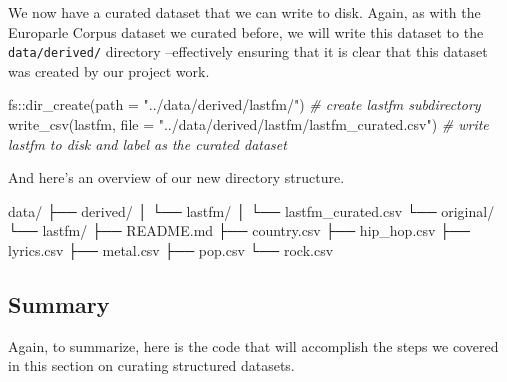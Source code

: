 \documentclass[
  letterpaper,
]{scrbook}
\newenvironment{Shaded}{\begin{snugshade}}{\end{snugshade}}
\newcommand{\AttributeTok}[1]{\textcolor[rgb]{0.00,0.00,0.00}{#1}}
\newcommand{\CommentTok}[1]{\textcolor[rgb]{0.00,0.00,0.00}{\textit{#1}}}
\newcommand{\ExtensionTok}[1]{\textcolor[rgb]{0.00,0.00,0.00}{#1}}
\newcommand{\FunctionTok}[1]{\textcolor[rgb]{0.00,0.00,0.00}{#1}}
\newcommand{\NormalTok}[1]{\textcolor[rgb]{0.00,0.00,0.00}{#1}}
\newcommand{\SpecialCharTok}[1]{\textcolor[rgb]{0.00,0.00,0.00}{#1}}
\newcommand{\StringTok}[1]{\textcolor[rgb]{0.00,0.00,0.00}{#1}}
\begin{document}
We now have a curated dataset that we can write to disk. Again, as with
the Europarle Corpus dataset we curated before, we will write this
dataset to the \texttt{data/derived/} directory --effectively ensuring
that it is clear that this dataset was created by our project work.

\begin{Shaded}
\begin{Highlighting}[]
\NormalTok{fs}\SpecialCharTok{::}\FunctionTok{dir\_create}\NormalTok{(}\AttributeTok{path =} \StringTok{"../data/derived/lastfm/"}\NormalTok{) }\CommentTok{\# create lastfm subdirectory}
\FunctionTok{write\_csv}\NormalTok{(lastfm, }
          \AttributeTok{file =} \StringTok{"../data/derived/lastfm/lastfm\_curated.csv"}\NormalTok{) }\CommentTok{\# write lastfm to disk and label as the curated dataset}
\end{Highlighting}
\end{Shaded}

And here's an overview of our new directory structure.

\begin{Shaded}
\begin{Highlighting}[]
\ExtensionTok{data/}
\ExtensionTok{├──}\NormalTok{ derived/}
\ExtensionTok{│}\NormalTok{   └── lastfm/}
\ExtensionTok{│}\NormalTok{       └── lastfm\_curated.csv}
\ExtensionTok{└──}\NormalTok{ original/}
    \ExtensionTok{└──}\NormalTok{ lastfm/}
        \ExtensionTok{├──}\NormalTok{ README.md}
        \ExtensionTok{├──}\NormalTok{ country.csv}
        \ExtensionTok{├──}\NormalTok{ hip\_hop.csv}
        \ExtensionTok{├──}\NormalTok{ lyrics.csv}
        \ExtensionTok{├──}\NormalTok{ metal.csv}
        \ExtensionTok{├──}\NormalTok{ pop.csv}
        \ExtensionTok{└──}\NormalTok{ rock.csv}
\end{Highlighting}
\end{Shaded}

\hypertarget{summary-7}{%
\subsection{Summary}\label{summary-7}}

Again, to summarize, here is the code that will accomplish the steps we
covered in this section on curating structured datasets.
\end{document}
